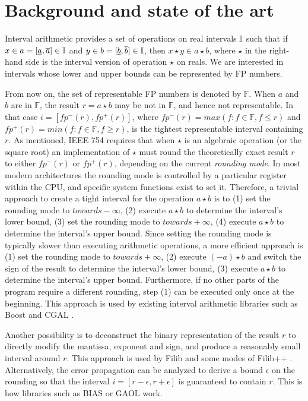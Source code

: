 
\section{Background and state of the art}
\label{sec:related}

Interval arithmetic \cite{hickey2001} provides a set of operations on real intervals $\mathbb{I}$ such that if $x\in a=[\underline{a},\overline{a}] \in \mathbb{I}$ and $y\in b=[\underline{b},\overline{b}] \in \mathbb{I}$,
then $x \star y  \in a \star b$, where $\star$ in the right-hand side is the interval version of operation $\star$ on reals.
We are interested in intervals whose lower and upper bounds can be represented by FP numbers.

From now on, the set of representable FP numbers is denoted by $\mathbb{F}$. When $a$ and $b$ are in $\mathbb{F}$, the result $r = a \star b$ may be not in $\mathbb{F}$, and hence not representable. In that case $i=[fp^{-}(r),fp^{+}(r)]$, where $fp^{-}(r) = max(f : f \in \mathbb{F}, f \leq r)$ and $fp^{+}(r) = min(f : f \in \mathbb{F}, f \geq r)$, is the tightest representable interval containing $r$.
As mentioned, IEEE 754 requires that when $\star$ is an algebraic operation (or the square root) an implementation of $\star$ must round the theoretically exact result $r$ to either $fp^{-}(r)$ or $fp^{+}(r)$, depending on the current \emph{rounding mode}.
In most modern architectures the rounding mode is controlled by a particular register within the CPU, and specific system functions exist to set it. Therefore, a trivial approach to create a tight interval for the operation $a \star b$ is to (1) set the rounding mode to $towards -\infty$, (2) execute $a \star b$ to determine the interval's lower bound, (3) set the rounding mode to $towards +\infty$, (4) execute $a \star b$ to determine the interval's upper bound.
Since setting the rounding mode is typically slower than executing arithmetic operations, a more efficient approach is (1) set the rounding mode to $towards +\infty$, (2) execute $(-a) \star b$ and switch the sign of the result to determine the interval's lower bound, (3) execute $a \star b$ to determine the interval's upper bound. Furthermore, if no other parts of the program require a different rounding, step (1) can be executed only once at the beginning.
This approach is used by existing interval arithmetic libraries such as Boost \cite{bronnimann2006} and CGAL \cite{cgal}.

Another possibility is to deconstruct the binary representation of the result $r$ to directly modify the mantissa, exponent and sign, and produce a reasonably small interval around $r$. This approach is used by Filib and some modes of Filib++ \cite{filib, filibpp}.
Alternatively, the error propagation can be analyzed to derive a bound $\epsilon$ on the rounding so that the interval $i=[r-\epsilon,r+\epsilon]$ is guaranteed to contain $r$. This is how libraries such as BIAS \cite{bias} or GAOL \cite{gaol} work.

